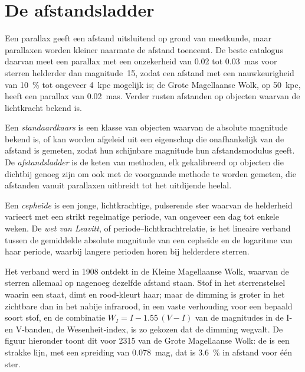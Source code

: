 \section{De afstandsladder}\label{sec:b3:milky-way-galaxies:ladder}

Een parallax geeft een afstand uitsluitend op grond van meetkunde, maar parallaxen worden kleiner naarmate de afstand toeneemt. De beste catalogus daarvan meet een parallax met een
onzekerheid van 0.02 tot \qty{0.03}{mas} voor sterren helderder dan
magnitude~15, zodat een afstand met een nauwkeurigheid van \qty{10}{\percent} tot ongeveer
\qty{4}{kpc} mogelijk is; de Grote Magellaanse Wolk, op \qty{50}{kpc}, heeft een
parallax van \qty{0.02}{mas}. Verder rusten afstanden op
objecten waarvan de
lichtkracht bekend is.

\begin{definition}\label{def:b3:milky-way-galaxies:ladder}
Een \emph{standaardkaars} is een klasse van objecten
waarvan de absolute magnitude bekend is, of kan worden afgeleid uit een eigenschap
die onafhankelijk van de afstand is gemeten, zodat hun schijnbare magnitude
hun afstandsmodulus geeft. De \emph{afstandsladder} is
de keten van methoden, elk gekalibreerd op objecten die dichtbij genoeg zijn om
ook met de voorgaande methode te worden gemeten, die afstanden vanuit
parallaxen uitbreidt tot het uitdijende heelal.
\end{definition}

\begin{definition}\label{def:b3:milky-way-galaxies:cepheid}
Een \emph{cepheïde} is een jonge, lichtkrachtige, pulserende
ster waarvan de helderheid varieert met een strikt regelmatige periode,
van ongeveer een dag tot enkele weken. De \emph{wet van Leavitt},
of periode--lichtkrachtrelatie, is het lineaire verband tussen de gemiddelde
absolute magnitude van een cepheïde en de logaritme van haar periode, waarbij
langere perioden horen bij helderdere sterren.
\end{definition}

Het verband werd in 1908 ontdekt in de Kleine Magellaanse Wolk, waarvan de sterren
allemaal op nagenoeg dezelfde afstand staan. Stof in het sterrenstelsel waarin een  staat,
dimt en rood-kleurt haar; maar de dimming is groter in het zichtbare dan in het
nabije infrarood, in een vaste verhouding voor een bepaald soort stof, en de combinatie
$W_I = I - 1.55\,(V - I)$ van de magnitudes in de I- en V-banden, de Wesenheit-index, is zo gekozen dat de dimming
wegvalt. De figuur hieronder toont dit voor 2315 
van de Grote Magellaanse Wolk:
de  is een strakke lijn, met een spreiding van
\qty{0.078}{mag}, dat is \qty{3.6}{\percent} in afstand voor één
ster.

